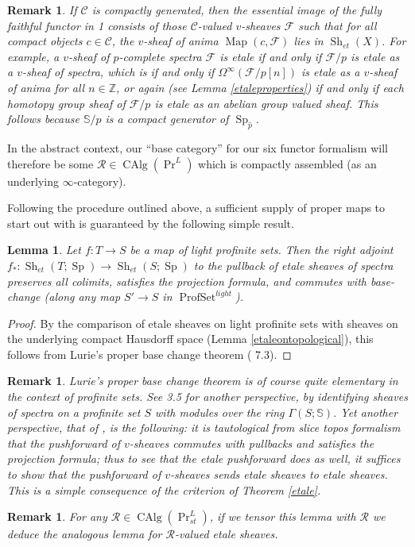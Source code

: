 \documentclass[12pt]{article}
\newtheorem{lemma}[theorem]{Lemma}
\newtheorem{remark}[theorem]{Remark}
\newcommand{\on}{\operatorname}
\newcommand{\mbb}{\mathbb}
\newcommand{\wh}{\widehat}
\begin{document}
\begin{remark}\label{etinsidev}
If $\mathcal{C}$ is compactly generated, then the essential image of the fully faithful functor in 1 consists of those $\mathcal{C}$-valued $v$-sheaves $\mathcal{F}$ such that for all compact objects $c\in\mathcal{C}$, the $v$-sheaf of anima $\on{Map}(c,\mathcal{F})$ lies in $\on{Sh}_{et}(X)$.  For example, a $v$-sheaf of $p$-complete spectra $\mathcal{F}$ is etale if and only if $\mathcal{F}/p$ is etale as a $v$-sheaf of spectra, which is if and only if $\Omega^\infty (\mathcal{F}/p[n])$ is etale as a $v$-sheaf of anima for all $n\in\mathbb{Z}$, or again (see Lemma \ref{etaleproperties}) if and only if each homotopy group sheaf  of $\mathcal{F}/p$ is etale as an abelian group valued sheaf.  This follows because $\mathbb{S}/p$ is a compact generator of $\on{Sp}_{\wh{p}}$.
\end{remark}

In the abstract context, our ``base category'' for our six functor formalism will therefore be some $\mathcal{R}\in\on{CAlg}(\on{Pr}^L)$ which is compactly assembled (as an underlying $\infty$-category).

Following the procedure outlined above, a sufficient supply of proper maps to start out with is guaranteed by the following simple result.

\begin{lemma}
Let $f:T\to S$ be a map of light profinite sets.  Then the right adjoint $f_\ast:\on{Sh}_{et}(T;\on{Sp})\to\on{Sh}_{et}(S;\on{Sp})$
to the pullback of etale sheaves of spectra preserves all colimits, satisfies the projection formula, and commutes with base-change (along any map $S'\to S$ in $\on{ProfSet}^{light}$).
\end{lemma}
\begin{proof}
By the comparison of etale sheaves on light profinite sets with sheaves on the underlying compact Hausdorff space (Lemma \ref{etaleontopological}), this follows from Lurie's proper base change theorem (\cite{LurieHTT} 7.3).
\end{proof}

\begin{remark}
Lurie's proper base change theorem is of course quite elementary in the context of profinite sets. See \cite{HeyerSixFunctors} 3.5 for another perspective, by identifying sheaves of spectra on a profinite set $S$ with modules over the ring $\Gamma(S;\mbb{S})$.  Yet another perspective, that of \cite{ScholzeDiamonds}, is the following: it is tautological from slice topos formalism that the pushforward of $v$-sheaves commutes with pullbacks and satisfies the projection formula; thus to see that the etale pushforward does as well, it suffices to show that the pushforward of $v$-sheaves sends etale sheaves to etale sheaves.  This is a simple consequence of the criterion of Theorem \ref{etale}.
\end{remark}
\begin{remark}
For any $\mathcal{R}\in\on{CAlg}(\on{Pr}_{st}^L)$, if we tensor this lemma with $\mathcal{R}$ we deduce the analogous lemma for $\mathcal{R}$-valued etale sheaves.
\end{remark}
\end{document}

